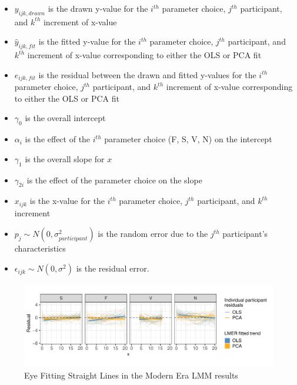 \documentclass[12pt]{article}
\providecommand{\tightlist}{%
  \setlength{\itemsep}{0pt}\setlength{\parskip}{0pt}}
\begin{document}
\begin{itemize}
\tightlist
\item
  \(y_{ijk,drawn}\) is the drawn y-value for the \(i^{th}\) parameter
  choice, \(j^{th}\) participant, and \(k^{th}\) increment of x-value
\item
  \(\hat y_{ijk,fit}\) is the fitted y-value for the \(i^{th}\)
  parameter choice, \(j^{th}\) participant, and \(k^{th}\) increment of
  x-value corresponding to either the OLS or PCA fit
\item
  \(e_{ijk,fit}\) is the residual between the drawn and fitted y-values
  for the \(i^{th}\) parameter choice, \(j^{th}\) participant, and
  \(k^{th}\) increment of x-value corresponding to either the OLS or PCA
  fit
\item
  \(\gamma_0\) is the overall intercept
\item
  \(\alpha_i\) is the effect of the \(i^{th}\) parameter choice (F, S,
  V, N) on the intercept
\item
  \(\gamma_1\) is the overall slope for \(x\)
\item
  \(\gamma_{2i}\) is the effect of the parameter choice on the slope
\item
  \(x_{ijk}\) is the x-value for the \(i^{th}\) parameter choice,
  \(j^{th}\) participant, and \(k^{th}\) increment
\item
  \(p_{j} \sim N(0, \sigma^2_{participant})\) is the random error due to
  the \(j^{th}\) participant's characteristics
\item
  \(\epsilon_{ijk} \sim N(0, \sigma^2)\) is the residual error.
\end{itemize}

\begin{figure}[tbp]

{\centering \includegraphics[width=1\linewidth,]{Eye-Fitting-Straight-Lines-in-the-Modern-Era_files/figure-latex/eyefitting-lmer-residualplots-1} 

}

\caption{Eye Fitting Straight Lines in the Modern Era LMM results}\label{fig:eyefitting-lmer-residualplots}
\end{figure}
\end{document}
